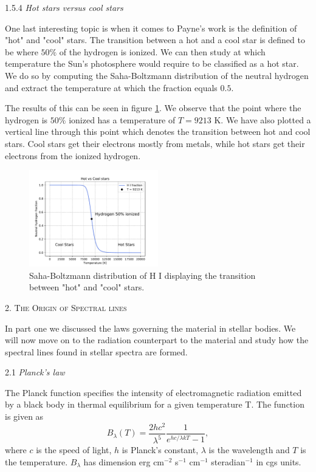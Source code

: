 \documentclass[a4paper,11.5pt,]{article}
\begin{document}
\begin{multicols}{2}
\begin{center}
1.5.4\textit{ Hot stars versus cool stars}
\end{center}

One last interesting topic is when it comes to Payne's work is the definition of "hot" and "cool" stars. The transition between a hot and a cool star is defined to be where $50\%$ of the hydrogen is ionized. We can then study at which temperature the Sun's photosphere would require to be classified as a hot star. We do so by computing the Saha-Boltzmann distribution of the neutral hydrogen and extract the temperature at which the fraction equals $0.5$.

The results of this can be seen in figure \ref{fig:11}. We observe that the point where the hydrogen is $50\%$ ionized has a temperature of $T = 9213$ K. We have also plotted a vertical line through this point which denotes the transition between hot and cool stars. Cool stars get their electrons mostly from metals, while hot stars get their electrons from the ionized hydrogen.

\begin{figure}[H]
	\centering
	\includegraphics[width=0.5\textwidth]{SSA/figures/hotcool.pdf}
	\caption{Saha-Boltzmann distribution of H I displaying the transition between "hot" and "cool" stars.}
	\label{fig:11}
\end{figure}


\begin{center}
\textsc{2. The Origin of Spectral lines}
\end{center}
In part one we discussed the laws governing the material in stellar bodies. We will now move on to the radiation counterpart to the material and study how the spectral lines found in stellar spectra are formed.

\begin{center}
2.1\textit{ Planck's law}
\end{center}
The Planck function specifies the intensity of electromagnetic radiation emitted by a black body in thermal equilibrium for a given temperature T. The function is given as
\begin{equation}\label{eq:}
    B_\lambda (T) = \frac{2hc^2}{\lambda^5} \frac{1}{e^{hc/\lambda kT} - 1},
\end{equation}
where $c$ is the speed of light, $h$ is Planck's constant, $\lambda$ is the wavelength and $T$ is the temperature. $B_\lambda$ has dimension erg cm$^{-2}$ s$^{-1}$ cm$^{-1}$ steradian$^{-1}$ in cgs units.


\end{multicols}
\end{document}
